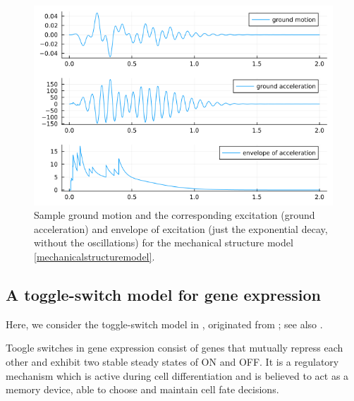 \documentclass[reqno,12pt]{amsart}
\theoremstyle{plain} %
\theoremstyle{definition} %
\begin{document}
\begin{figure}[htb]
    \includegraphics[scale=0.4]{img/noise_earthquake.png}
    \caption{Sample ground motion and the corresponding excitation (ground acceleration) and envelope of excitation (just the exponential decay, without the oscillations) for the mechanical structure model \eqref{mechanicalstructuremodel}.}
    \label{figearthquakenoise}
\end{figure}

\subsection{A toggle-switch model for gene expression}

Here, we consider the toggle-switch model in \cite[Section 7.8]{Asai2016}, originated from \cite{VerdCrombachJaeger2014}; see also \cite{StrasserTheisMarr2012}.

Toogle switches in gene expression consist of genes that mutually repress each other and exhibit two stable steady states of ON and OFF. It is a regulatory mechanism which is active during cell differentiation and is believed to act as a memory device, able to choose and maintain cell fate decisions.
\end{document}
